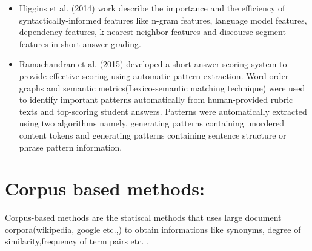 \documentclass[rnd]{mas_proposal}
\begin{document}
\begin{itemize}
	\item Higgins et al. (2014) \cite{Higgins2014} work describe the importance and the efficiency of syntactically-informed features like n-gram features, language model features, dependency features, k-nearest neighbor features and discourse segment features in short answer grading.
    \item Ramachandran et al. (2015) \cite{Ramachandran2015} developed a short answer scoring system to provide effective scoring using automatic pattern extraction. Word-order graphs and semantic metrics(Lexico-semantic matching technique) were used to identify important patterns automatically from human-provided rubric texts and top-scoring student answers. Patterns were automatically extracted using two algorithms namely, generating patterns containing unordered content tokens and generating patterns containing sentence structure or phrase pattern information.
    
\end{itemize}

\section{Corpus based methods:}

Corpus-based methods are the statiscal methods that uses large document corpora(wikipedia, google etc.,) to obtain informations like synonyms, degree of similarity,frequency of term pairs etc. \cite{Burrows2015},
\end{document}
